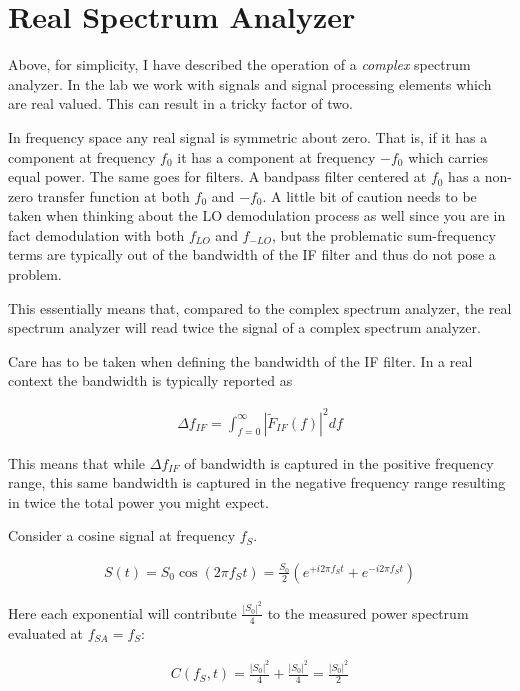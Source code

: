 \documentclass[12pt]{article}
\begin{document}
\section{Real Spectrum Analyzer}

Above, for simplicity, I have described the operation of a \textit{complex} spectrum analyzer. 
In the lab we work with signals and signal processing elements which are real valued.
This can result in a tricky factor of two.

In frequency space any real signal is symmetric about zero.
That is, if it has a component at frequency $f_0$ it has a component at frequency $-f_0$ which carries equal power.
The same goes for filters.
A bandpass filter centered at $f_0$ has a non-zero transfer function at both $f_0$ and $-f_0$.
A little bit of caution needs to be taken when thinking about the LO demodulation process as well since you are in fact demodulation with both $f_{LO}$ and $f_{-LO}$, but the problematic sum-frequency terms are typically out of the bandwidth of the IF filter and thus do not pose a problem.

This essentially means that, compared to the complex spectrum analyzer, the real spectrum analyzer will read twice the signal of a complex spectrum analyzer.

Care has to be taken when defining the bandwidth of the IF filter.
In a real context the bandwidth is typically reported as

\begin{align}
\Delta f_{IF} = \int_{f=0}^{\infty} \left|\tilde{F}_{IF}(f)\right|^2 df
\end{align}

This means that while $\Delta f_{IF}$ of bandwidth is captured in the positive frequency range, this same bandwidth is captured in the negative frequency range resulting in twice the total power you might expect.

Consider a cosine signal at frequency $f_S$.

\begin{align}
S(t) = S_0 \cos(2\pi f_S t) = \frac{S_0}{2} \left(e^{+i 2\pi f_S t} + e^{-i 2\pi f_S t}\right)
\end{align}

Here each exponential will contribute $\frac{|S_0|^2}{4}$ to the measured power spectrum evaluated at $f_{SA} = f_S$:

\begin{align}
C(f_S, t) = \frac{|S_0|^2}{4} + \frac{|S_0|^2}{4} = \frac{|S_0|^2}{2}
\end{align}
\end{document}
